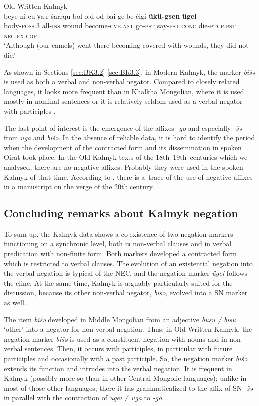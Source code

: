\documentclass[output=paper,draft,draftmode,colorlinks,citecolor=brown]{langscibook}
\begin{document}
\ea Old Written Kalmyk \citep[103]{bembeev2004a} \label{ex:BK54}\\
	\gll beye-ni cu-γa:r šarrqu bol-o:d od-bai ge-be čigi \textbf{ükü-gsen} \textbf{ügei}\\
	body-\textsc{poss.3} all-\textsc{ins} wound become-\textsc{cvb.ant} go-\textsc{pst} say-\textsc{pst} \textsc{conc} die-\textsc{ptcp.pst} \textsc{neg.ex.cop}\\
	\glt `Although (our camels) went there becoming covered with wounds, they did not die.'
\z


As shown in Sections \ref{sec:BK3.2}-\ref{sec:BK3.3}, in Modern Kalmyk, the marker \textit{bišǝ} is used as both a verbal and non-verbal negator. Compared to closely related languages, it looks more frequent than in Khalkha Mongolian, where it is used mostly in nominal sentences \citep[123--125]{yu1991a} or it is relatively seldom used as a verbal negator with participles \citep[251]{janhunen2012a}.

The last point of interest is the emergence of the affixes \textit{-go} and especially \textit{-šə} from \textit{uga} and \textit{bišə}. In the absence of reliable data, it is hard to identify the period when the development of the contracted form and its dissemination in spoken Oirat took place. In the Old Kalmyk texts of the 18th–19th centuries which we analysed, there are no negative affixes. Probably they were used in the spoken Kalmyk of that time. According to \citet[114]{bembeev2004a}, there is a trace of the use of negative affixes in a manuscript on the verge of the 20th century.


\subsection{Concluding remarks about Kalmyk negation}\label{sec:BK3.5}

To sum up, the Kalmyk data shows a co-existence of two negation markers functioning on a synchronic level, both in non-verbal clauses and in verbal predication with non-finite form. Both markers developed a contracted form which is restricted to verbal clauses. The evolution of an existential negation into the verbal negation is typical of the NEC, and the negation marker \textit{ügei} follows the cline. At the same time, Kalmyk is arguably particularly suited for the discussion, because its other non-verbal negator, \textit{bisə}, evolved into a SN marker as well.

The item \textit{bišǝ} developed in Middle Mongolian from an adjective \textit{busu / bisu} ‘other’ into a negator for non-verbal negation. Thus, in Old Written Kalmyk, the negation marker \textit{bišǝ} is used as a constituent negation with nouns and in non-verbal sentences. Then, it occurs with participles, in particular with future participles and occasionally with a past participle. So, the negation marker \textit{bišǝ} extends its function and intrudes into the verbal negation. It is frequent in Kalmyk (possibly more so than in other Central Mongolic languages); unlike in most of those other languages, there it has grammaticalized to the affix of SN \textit{-šǝ} in parallel with the contraction of \textit{ügei / uga} to \textit{‑go}.
\end{document}
